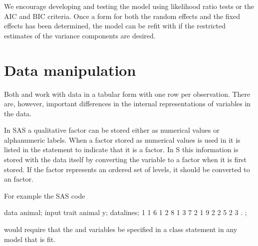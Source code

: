 \documentclass[12pt]{article}
\newcommand{\s}{\textsf{S}}
\begin{document}
We encourage developing and testing the model using likelihood ratio
tests or the \textsf{AIC} and \textsf{BIC} criteria.  Once a form
for both the random effects and the fixed effects has been determined,
the model can be refit with  if the restricted
estimates of the variance components are desired.

\section{Data manipulation}
\label{sec:data}

Both  and  work with data in a tabular form
with one row per observation.  There are, however, important
differences in the internal representations of variables in the data.

In \textsf{SAS} a qualitative factor can be stored either as numerical
values or alphanumeric labels.  When a factor stored as numerical
values is used in  it is listed in the 
statement to indicate that it is a factor.  In \s{} this information
is stored with the data itself by converting the variable to a factor
when it is first stored.  If the factor represents an ordered set of
levels, it should be converted to an  factor.

For example the SAS code
\begin{Example}
data animal;
 input trait animal y;
 datalines;
1 1 6
1 2 8
1 3 7
2 1 9
2 2 5
2 3 .
;
\end{Example}
would require that the  and  variables be
specified in a class statement in any model that is fit.
\end{document}
